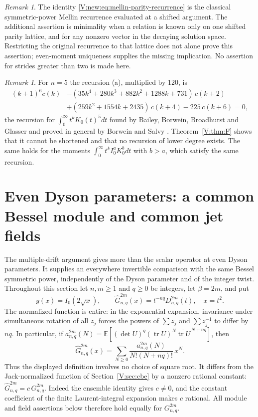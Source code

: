 \documentclass[11pt,a4paper]{article}
\theoremstyle{definition}
\theoremstyle{remark}
\newtheorem{remark}[theorem]{Remark}
\numberwithin{equation}{section}
\begin{document}
\begin{remark}
The identity \eqref{V:new:eq:mellin-parity-recurrence} is the
classical symmetric-power Mellin recurrence evaluated at a shifted
argument. The additional assertion is minimality when a relation is
known only on one shifted parity lattice, and for any nonzero vector
in the decaying solution space. Restricting the original recurrence
to that lattice does not alone prove this assertion; even-moment
uniqueness supplies the missing implication. No assertion for strides
greater than two is made here.
\end{remark}


\begin{remark}
For $n=5$ the recursion (a), multiplied by $120$, is
\[
\begin{aligned}
(k+1)^6c(k)&-(35k^4+280k^3+882k^2+1288k+731)\,c(k+2)\\
&+(259k^2+1554k+2435)\,c(k+4)-225\,c(k+6)=0,
\end{aligned}
\]
the recursion for $\int_0^\infty t^kK_0(t)^5dt$ found by Bailey, Borwein, Broadhurst and Glasser \cite{BBBG08} and proved in general by Borwein and Salvy \cite{BS08}. Theorem~\ref{V:thm:F} shows that it cannot be shortened and that no recursion of lower degree exists. The same holds for the moments $\int_0^\infty t^kI_0^aK_0^bdt$ with $b>a$, which satisfy the same recursion.
\end{remark}

\section{Even Dyson parameters: a common Bessel module and common jet fields}
\label{evb:section}

The multiple-drift argument gives more than the scalar operator at even
Dyson parameters. It supplies an everywhere invertible comparison with
the same Bessel symmetric power, independently of the Dyson parameter
and of the integer twist. Throughout this section let $n,m\ge1$ and
$q\ge0$ be integers, let $\beta=2m$, and put
\[
 y(x)=I_0(2\sqrt{x}),\qquad
 \widehat G^{2m}_{n,q}(x)=t^{-nq}D^{2m}_{n,q}(t),\quad x=t^2.
\]
The normalized function is entire: in the exponential expansion,
invariance under simultaneous rotation of all $z_j$ forces the powers
of $\sum z_j$ and $\sum z_j^{-1}$ to differ by $nq$. In particular,
if
$a^{2m}_{n,q}(N)=\mathbb E[(\det U)^q(\operatorname{tr}U)^N
\overline{\operatorname{tr}U}^{\,N+nq}]$, then
\begin{equation}\label{evb:series}
 \widehat G^{2m}_{n,q}(x)
   =\sum_{N\ge0}\frac{a^{2m}_{n,q}(N)}{N!(N+nq)!}\,x^N.
\end{equation}
Thus the displayed definition involves no choice of square root.
It differs from the Jack-normalized function of Section~\ref{V:sec:cbe}
by a nonzero rational constant:
$\widehat G^{2m}_{n,q}=c\,G^{2m}_{n,q}$.
Indeed the ensemble identity gives $c\ne0$, and the constant coefficient
of the finite Laurent-integral expansion makes $c$ rational.
All module and field assertions below therefore hold equally for
$G^{2m}_{n,q}$.
\end{document}
